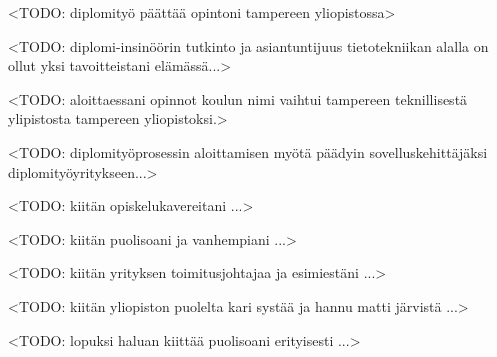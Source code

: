 <TODO: diplomityö päättää opintoni tampereen yliopistossa>

<TODO: diplomi-insinöörin tutkinto ja asiantuntijuus tietotekniikan alalla on ollut yksi tavoitteistani elämässä...>

<TODO: aloittaessani opinnot koulun nimi vaihtui tampereen teknillisestä ylipistosta tampereen yliopistoksi.>

<TODO: diplomityöprosessin aloittamisen myötä päädyin sovelluskehittäjäksi diplomityöyritykseen...>

<TODO: kiitän opiskelukavereitani ...>

<TODO: kiitän puolisoani ja vanhempiani ...>

<TODO: kiitän yrityksen toimitusjohtajaa ja esimiestäni ...>

<TODO: kiitän yliopiston puolelta kari systää ja hannu matti järvistä ...>

<TODO: lopuksi haluan kiittää puolisoani erityisesti ...>

